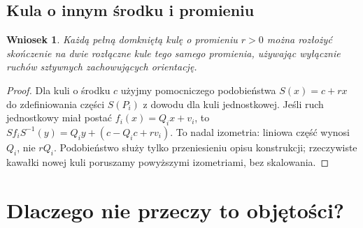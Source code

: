 \documentclass[11pt,a4paper]{article}
\numberwithin{equation}{section}
\theoremstyle{plain}
\newtheorem{wniosek}[twierdzenie]{Wniosek}
\theoremstyle{definition}
\theoremstyle{remark}
\begin{document}
\subsection{Kula o innym środku i promieniu}
\begin{wniosek}\label{wn:dowolna-kula}
Każdą pełną domkniętą kulę o promieniu $r>0$ można rozłożyć skończenie na dwie rozłączne kule tego samego promienia, używając wyłącznie ruchów sztywnych zachowujących orientację.
\end{wniosek}
\begin{proof}
Dla kuli o środku $c$ użyjmy pomocniczego podobieństwa $S(x)=c+rx$ do zdefiniowania części $S(P_i)$ z dowodu dla kuli jednostkowej. Jeśli ruch jednostkowy miał postać $f_i(x)=Q_ix+v_i$, to $Sf_iS^{-1}(y)=Q_iy+(c-Q_ic+rv_i)$. To nadal izometria: liniowa część wynosi $Q_i$, nie $rQ_i$. Podobieństwo służy tylko przeniesieniu opisu konstrukcji; rzeczywiste kawałki nowej kuli poruszamy powyższymi izometriami, bez skalowania.
\end{proof}

\section{Dlaczego nie przeczy to objętości?}
\end{document}
